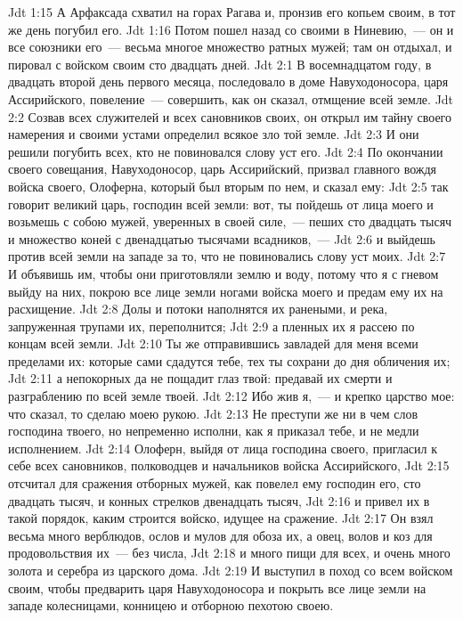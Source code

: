 \vs Jdt 1:15 А Арфаксада схватил на горах Рагава и, пронзив его копьем своим, в тот же день погубил его.
\vs Jdt 1:16 Потом пошел назад со своими в Ниневию,~--- он и все союзники его~--- весьма многое множество ратных мужей; там он отдыхал, и пировал с войском своим сто двадцать дней.
\vs Jdt 2:1 В восемнадцатом году, в двадцать второй день первого месяца, последовало в доме Навуходоносора, царя Ассирийского, повеление~--- совершить, как он сказал, отмщение всей земле.
\vs Jdt 2:2 Созвав всех служителей и всех сановников своих, он открыл им тайну своего намерения и своими устами определил всякое зло той земле.
\vs Jdt 2:3 И они решили погубить всех, кто не повиновался слову уст его.
\vs Jdt 2:4 По окончании своего совещания, Навуходоносор, царь Ассирийский, призвал главного вождя войска своего, Олоферна, который был вторым по нем, и сказал ему:
\vs Jdt 2:5 так говорит великий царь, господин всей земли: вот, ты пойдешь от лица моего и возьмешь с собою мужей, уверенных в своей силе,~--- пеших сто двадцать тысяч и множество коней с двенадцатью тысячами всадников,~---
\vs Jdt 2:6 и выйдешь против всей земли на западе за то, что не повиновались слову уст моих.
\vs Jdt 2:7 И объявишь им, чтобы они приготовляли землю и воду, потому что я с гневом выйду на них, покрою все лице земли  ногами войска моего и предам ему их на расхищение.
\vs Jdt 2:8 Долы и потоки наполнятся их ранеными, и река, запруженная трупами их, переполнится;
\vs Jdt 2:9 а пленных их я рассею по концам всей земли.
\vs Jdt 2:10 Ты же отправившись завладей для меня всеми пределами их: которые сами сдадутся тебе, тех ты сохрани до дня обличения их;
\vs Jdt 2:11 а непокорных да не пощадит глаз твой: предавай их смерти и разграблению по всей земле твоей.
\vs Jdt 2:12 Ибо жив я,~--- и крепко царство мое: что сказал, то сделаю моею рукою.
\vs Jdt 2:13 Не преступи же ни в чем слов господина твоего, но непременно исполни, как я приказал тебе, и не медли исполнением.
\rsbpar\vs Jdt 2:14 Олоферн, выйдя от лица господина своего, пригласил к себе всех сановников, полководцев и начальников войска Ассирийского,
\vs Jdt 2:15 отсчитал для сражения отборных мужей, как повелел ему господин его, сто двадцать тысяч, и конных стрелков двенадцать тысяч,
\vs Jdt 2:16 и привел их в такой порядок, каким строится войско, идущее на сражение.
\vs Jdt 2:17 Он взял весьма много верблюдов, ослов и мулов для обоза их, а овец, волов и коз для продовольствия их~--- без числа,
\vs Jdt 2:18 и много пищи для всех, и очень много золота и серебра из царского дома.
\vs Jdt 2:19 И выступил в поход со всем войском своим, чтобы предварить царя Навуходоносора и покрыть все лице земли на западе колесницами, конницею и отборною пехотою своею.
